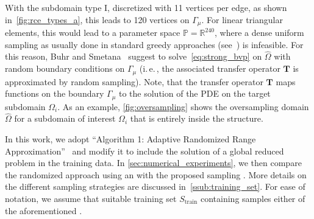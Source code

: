 \documentclass[AMA,STIX1COL,doublespace]{WileyNJD-v2}
\begin{document}
With the subdomain type I, discretized with 11 vertices per edge, as shown in~\cref{fig:rce_types_a}, this leads to 120 vertices on $\varGamma_{\mu}$.
For linear triangular elements, this would lead to a parameter space $\mathbb{P} = \mathbb{R}^{240}$, where a dense uniform sampling as usually done in standard greedy approaches (see~\cite{VeroyEtAl2003}) is infeasible.
For this reason, Buhr and Smetana~\cite{BS2018} suggest to solve~\cref{eq:strong_bvp} on $\hat\varOmega$ with random boundary conditions on $\varGamma_{\mu}$ (i.\,e.\,, the associated transfer operator $\bm{T}$ is approximated by random sampling).
Note, that the transfer operator $\bm{T}$ maps functions on the boundary $\varGamma_{\mu}$ to the solution of the PDE on the target subdomain $\varOmega_i$.
As an example, \cref{fig:oversampling} shows the oversampling domain $\hat{\varOmega}$ for a subdomain of interest $\varOmega_i$ that is entirely inside the structure.

In this work, we adopt \enquote{Algorithm 1: Adaptive Randomized Range Approximation}~\cite{BS2018} and modify it to include the solution of a global reduced problem in the training data.
In \cref{sec:numerical_experiments}, we then compare the randomized approach using an  with the proposed  sampling .
More details on the different sampling strategies are discussed in~\cref{ssub:training_set}.
For ease of notation, we assume that  suitable training set $S_{\mathrm{train}}$ containing samples  either of the aforementioned
.
\end{document}
